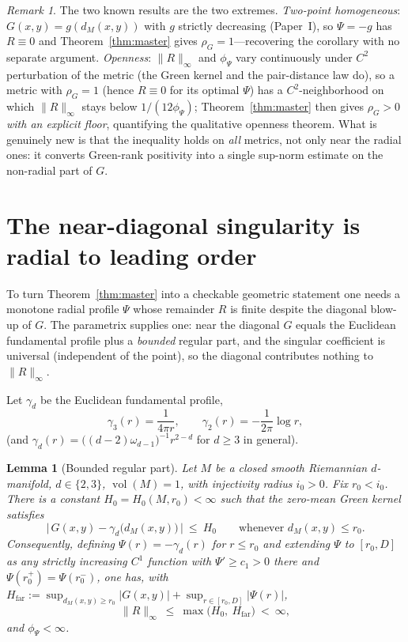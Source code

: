 \documentclass[11pt]{article}
\newtheorem{lemma}[theorem]{Lemma}
\theoremstyle{remark}
\newtheorem{remark}[theorem]{Remark}
\newcommand{\vol}{\operatorname{vol}}
\newcommand{\Rem}{R}
\newcommand{\dM}{d_M}
\newcommand{\rhoG}{\rho_G}
\begin{document}
\begin{remark}
The two known results are the two extremes. \emph{Two-point homogeneous}: $G(x,y)=g(\dM(x,y))$
with $g$ strictly decreasing (Paper~I), so $\Psi=-g$ has $\Rem\equiv0$ and
Theorem~\ref{thm:master} gives $\rhoG=1$---recovering the corollary with no separate
argument. \emph{Openness}: $\lVert\Rem\rVert_\infty$ and $\phi_\Psi$ vary continuously
under $C^2$ perturbation of the metric (the Green kernel and the pair-distance law do),
so a metric with $\rhoG=1$ (hence $\Rem\equiv0$ for its optimal $\Psi$) has a
$C^2$-neighborhood on which $\lVert\Rem\rVert_\infty$ stays below $1/(12\phi_\Psi)$;
Theorem~\ref{thm:master} then gives $\rhoG>0$ \emph{with an explicit floor}, quantifying
the qualitative openness theorem. What is genuinely new is that the inequality holds on
\emph{all} metrics, not only near the radial ones: it converts Green-rank positivity into
a single sup-norm estimate on the non-radial part of $G$.
\end{remark}

\section{The near-diagonal singularity is radial to leading order}

To turn Theorem~\ref{thm:master} into a checkable geometric statement one needs a
monotone radial profile $\Psi$ whose remainder $\Rem$ is finite despite the diagonal
blow-up of $G$. The parametrix supplies one: near the diagonal $G$ equals the Euclidean
fundamental profile plus a \emph{bounded} regular part, and the singular coefficient is
universal (independent of the point), so the diagonal contributes nothing to
$\lVert\Rem\rVert_\infty$.

Let $\gamma_d$ be the Euclidean fundamental profile,
\[
\gamma_3(r)=\frac{1}{4\pi r},\qquad \gamma_2(r)=-\frac{1}{2\pi}\log r,
\]
(and $\gamma_d(r)=\bigl((d-2)\omega_{d-1}\bigr)^{-1}r^{2-d}$ for $d\ge3$ in general).

\begin{lemma}[Bounded regular part]\label{lem:parametrix}
Let $M$ be a closed smooth Riemannian $d$-manifold, $d\in\{2,3\}$, $\vol(M)=1$, with
injectivity radius $i_0>0$. Fix $r_0<i_0$. There is a constant $H_0=H_0(M,r_0)<\infty$
such that the zero-mean Green kernel satisfies
\[
\bigl\lvert\,G(x,y)-\gamma_d\bigl(\dM(x,y)\bigr)\,\bigr\rvert\ \le\ H_0
\qquad\text{whenever }\dM(x,y)\le r_0 .
\]
Consequently, defining $\Psi(r)=-\gamma_d(r)$ for $r\le r_0$ and extending $\Psi$ to
$[r_0,D]$ as any strictly increasing $C^1$ function with $\Psi'\ge c_1>0$ there and
$\Psi(r_0^+)=\Psi(r_0^-)$, one has, with $H_{\mathrm{far}}:=\sup_{\dM(x,y)\ge r_0}\lvert G(x,y)\rvert
+\sup_{r\in[r_0,D]}\lvert\Psi(r)\rvert$,
\[
\lVert\Rem\rVert_\infty\ \le\ \max\bigl(H_0,\ H_{\mathrm{far}}\bigr)\ <\ \infty,
\]
and $\phi_\Psi<\infty$.
\end{lemma}
\end{document}
